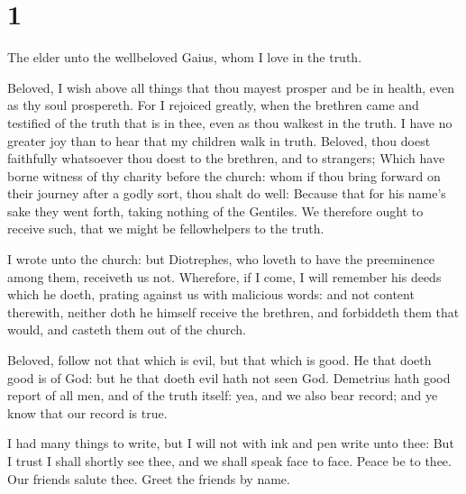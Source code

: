 \hypertarget{section}{%
\section{1}\label{section}}

 The elder unto the wellbeloved Gaius, whom I love in the
truth.

 Beloved, I wish above all things that thou mayest prosper
and be in health, even as thy soul prospereth.  For I
rejoiced greatly, when the brethren came and testified of the truth that
is in thee, even as thou walkest in the truth.  I have no
greater joy than to hear that my children walk in truth. 
Beloved, thou doest faithfully whatsoever thou doest to the brethren,
and to strangers;  Which have borne witness of thy charity
before the church: whom if thou bring forward on their journey after a
godly sort, thou shalt do well:  Because that for his name's
sake they went forth, taking nothing of the Gentiles.  We
therefore ought to receive such, that we might be fellowhelpers to the
truth.

 I wrote unto the church: but Diotrephes, who loveth to have
the preeminence among them, receiveth us not.  Wherefore,
if I come, I will remember his deeds which he doeth, prating against us
with malicious words: and not content therewith, neither doth he himself
receive the brethren, and forbiddeth them that would, and casteth them
out of the church.

 Beloved, follow not that which is evil, but that which is
good. He that doeth good is of God: but he that doeth evil hath not seen
God.  Demetrius hath good report of all men, and of the
truth itself: yea, and we also bear record; and ye know that our record
is true.

 I had many things to write, but I will not with ink and
pen write unto thee:  But I trust I shall shortly see thee,
and we shall speak face to face. Peace be to thee. Our friends salute
thee. Greet the friends by name.
